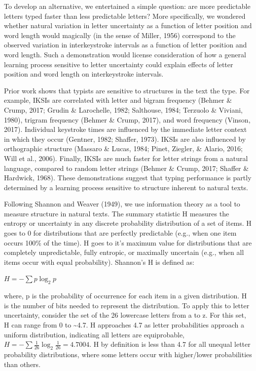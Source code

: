 \documentclass[,man,floatsintext]{apa6}
\begin{document}
To develop an alternative, we entertained a simple question: are more predictable letters typed faster than less predictable letters? More specifically, we wondered whether natural variation in letter uncertainty as a function of letter position and word length would magically (in the sense of Miller, 1956) correspond to the observed variation in interkeystroke intervals as a function of letter position and word length. Such a demonstration would license consideration of how a general learning process sensitive to letter uncertainty could explain effects of letter position and word length on interkeystroke intervals.

Prior work shows that typists are sensitive to structures in the text the type. For example, IKSIs are correlated with letter and bigram frequency (Behmer \& Crump, 2017; Grudin \& Larochelle, 1982; Salthouse, 1984; Terzuolo \& Viviani, 1980), trigram frequency (Behmer \& Crump, 2017), and word frequency (Vinson, 2017). Individual keystroke times are influenced by the immediate letter context in which they occur (Gentner, 1982; Shaffer, 1973). IKSIs are also influenced by orthographic structure (Massaro \& Lucas, 1984; Pinet, Ziegler, \& Alario, 2016; Will et al., 2006). Finally, IKSIs are much faster for letter strings from a natural language, compared to random letter strings (Behmer \& Crump, 2017; Shaffer \& Hardwick, 1968). These demonstrations suggest that typing performance is partly determined by a learning process sensitive to structure inherent to natural texts.

Following Shannon and Weaver (1949), we use information theory as a tool to measure structure in natural texts. The summary statistic H measures the entropy or uncertainty in any discrete probability distribution of a set of items. H goes to 0 for distributions that are perfectly predictable (e.g., when one item occurs 100\% of the time). H goes to it's maximum value for distributions that are completely unpredictable, fully entropic, or maximally uncertain (e.g., when all items occur with equal probability). Shannon's H is defined as:

\(H = -\sum p \log_2 p\)

where, p is the probability of occurrence for each item in a given distribution. H is the number of bits needed to represent the distribution. To apply this to letter uncertainty, consider the set of the 26 lowercase letters from a to z. For this set, H can range from 0 to \textasciitilde{}4.7. H approaches 4.7 as letter probabilities approach a uniform distribution, indicating all letters are equiprobable, \(H = -\sum \frac{1}{26} \log_2 \frac{1}{26} = 4.7004\). H by definition is less than 4.7 for all unequal letter probability distributions, where some letters occur with higher/lower probabilities than others.
\end{document}
